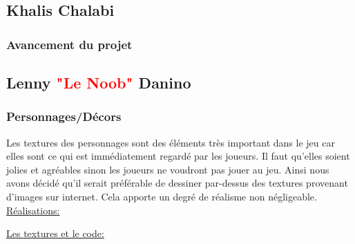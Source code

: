 \documentclass{article}
\begin{document}
\newpage

\subsection{Khalis Chalabi}

\subsubsection{Avancement du projet}

\newpage

\subsection{Lenny \textcolor{red}{"Le Noob"} Danino}
\subsubsection{Personnages/Décors}

\par
Les textures des personnages sont des éléments très important dans le jeu car elles sont ce qui est immédiatement regardé par les joueurs. Il faut qu’elles soient jolies et agréables sinon les joueurs ne voudront pas jouer au jeu. Ainsi nous avons décidé qu’il serait préférable de dessiner par-dessus des textures provenant d’images sur internet. Cela apporte un degré de réalisme non négligeable.
\newline
\newline
\underline{Réalisations:}

\par
\underline{Les textures et le code:}
\newline
\end{document}
